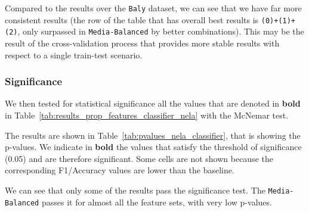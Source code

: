 Compared to the results over the \texttt{Baly} dataset, we can see that we have far more consistent results (the row of the table that has overall best results is \texttt{(0)+(1)+(2)}, only surpassed in \texttt{Media-Balanced} by better combinations).
This may be the result of the cross-validation process that provides more stable results with respect to a single train-test scenario. 

\subsubsection{Significance}
We then tested for statistical significance all the values that are denoted in \textbf{bold} in Table~\ref{tab:results_prop_features_classifier_nela} with the McNemar test.

\begin{table}[!htbp]
    \centering
    \caption{p-values of features set that have improvements in NELA dataset.}
    \label{tab:pvalues_nela_classifier}
\end{table}

The results are shown in Table~\ref{tab:pvalues_nela_classifier}, that is showing the p-values. We indicate in \textbf{bold} the values that satisfy the threshold of significance (0.05) and are therefore significant. Some cells are not shown because the corresponding F1/Accuracy values are lower than the baseline.

We can see that only some of the results pass the significance test. The \texttt{Media-Balanced} passes it for almost all the feature sets, with very low p-values. 

